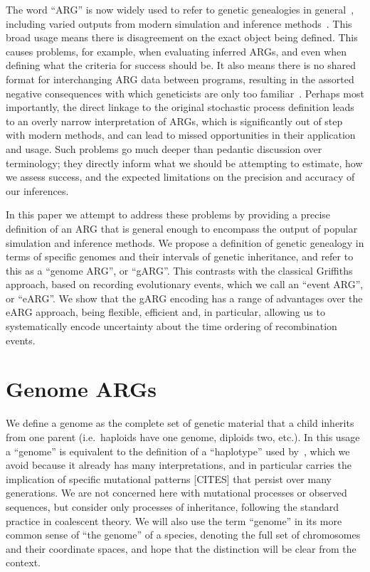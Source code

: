 \documentclass{article}
\begin{document}
The word ``ARG'' is now widely used to refer to genetic genealogies in
general~\citep[MORE][]{mathieson2020ancestry}, including
varied outputs from modern simulation and
inference methods~\citep{rasmussen2014genome, palamara2016argon, haller2018tree,
kelleher2019inferring, speidel2019method, baumdicker2021efficient, zhang2023biobank}.
This broad usage means there is disagreement on the
exact object being defined. This causes problems, for example,
when evaluating inferred ARGs, and even when defining
what the criteria for success should be.
It also means there is no shared format for interchanging ARG data between
programs, resulting in the assorted negative consequences with which
geneticists are only too familiar~\citep{excoffier2006computer}.
Perhaps most importantly, the direct linkage to
the original stochastic process definition leads to an
overly narrow interpretation of ARGs, which is significantly
out of step with modern methods, and
can lead to missed opportunities in their application and usage.
Such problems go much deeper than pedantic discussion over terminology;
they directly inform what we should be attempting to estimate, how we
assess success, and the expected limitations on the precision
and accuracy of our inferences.

In this paper we attempt to address these problems by
providing a precise definition of an ARG that is general enough to encompass
the output of popular simulation and inference methods.
We propose a definition of genetic genealogy in terms of specific genomes
and their intervals of genetic inheritance, and refer to this as
a ``genome ARG'', or ``gARG''.
This contrasts with the classical Griffiths approach,
based on recording evolutionary events, which we call
an ``event ARG'', or ``eARG''.
We show that the gARG encoding has a range of advantages over the
eARG approach, being flexible, efficient and, in particular,
allowing us to systematically encode uncertainty about the
time ordering of recombination events.

\section*{Genome ARGs}
We define a genome as the complete set of genetic material that a child
inherits from one parent (i.e.\ haploids have one genome, diploids two, etc.).
In this usage a ``genome'' is equivalent to the definition of a
``haplotype'' used by~\cite{shipilina2023origin}, which we avoid because
it already has many interpretations, and in particular carries the implication of
specific mutational patterns [CITES] that persist over
many generations.
We are not concerned here with mutational processes or observed sequences,
but consider only processes of inheritance,
following the standard practice in coalescent theory.
We will also use the term ``genome'' in its
more common sense of ``the genome'' of a species, denoting the full set
of chromosomes and their coordinate spaces, and hope that the distinction
will be clear from the context.
\end{document}
